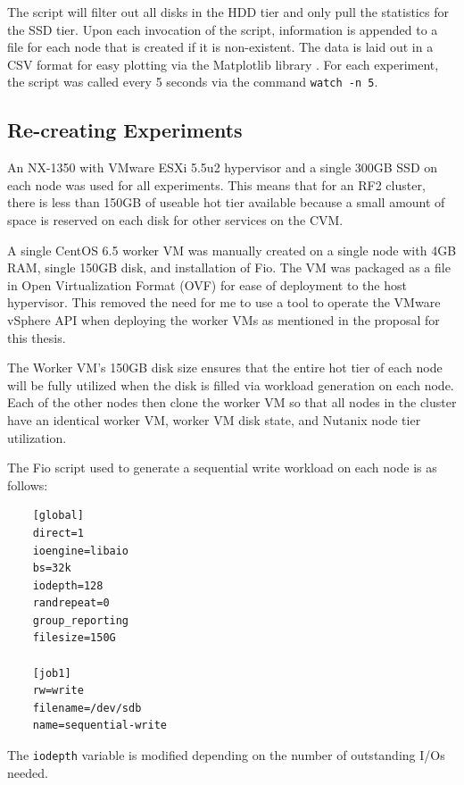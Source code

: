 \documentclass[12pt]{article}
\begin{document}
  The script will filter out all disks in the HDD tier and only pull the
  statistics for the SSD tier. Upon each invocation of the script, information
  is appended to a file for each node that is created if it is non-existent.
  The data is laid out in a CSV format for easy plotting via the Matplotlib
  library \cite{matplotlib}. For each experiment, the script was called every 5
  seconds via the command \texttt{watch -n 5}.

  \subsection{Re-creating Experiments}

  An NX-1350 with VMware ESXi 5.5u2 hypervisor and a single 300GB SSD on each
  node was used for all experiments. This means that for an RF2
  cluster, there is less than 150GB of useable hot tier available because a small
  amount of space is reserved on each disk for other services on the CVM.

  A single CentOS 6.5 worker VM was manually created on a single node with 4GB
  RAM, single 150GB disk, and installation of Fio. The VM was packaged as a
  file in Open Virtualization Format (OVF) for ease of deployment to the host
  hypervisor. This removed the need for me to use a tool to operate the VMware
  vSphere API when deploying the worker VMs as mentioned in the proposal for
  this thesis.

  The Worker VM's 150GB disk size ensures that the entire hot tier of each node
  will be fully utilized when the disk is filled via workload generation on
  each node. Each of the other nodes then clone the worker VM so that all nodes
  in the cluster have an identical worker VM, worker VM disk state, and Nutanix
  node tier utilization.

  The Fio script used to generate a sequential write workload on each node is
  as follows:
  
  \singlespace
  \begin{tcolorbox}
  \begin{verbatim}
    [global]
    direct=1
    ioengine=libaio
    bs=32k
    iodepth=128
    randrepeat=0
    group_reporting
    filesize=150G

    [job1]
    rw=write
    filename=/dev/sdb
    name=sequential-write
  \end{verbatim}
  \end{tcolorbox}
  \doublespace

  The \texttt{iodepth} variable is modified depending on the number of
  outstanding I/Os needed.
\end{document}
